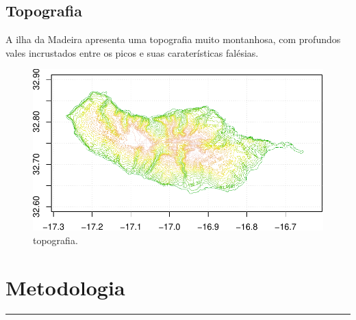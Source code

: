 \documentclass[]{article}
\begin{document}
\subsection{Topografia}\label{topografia}

A ilha da Madeira apresenta uma topografia muito montanhosa, com
profundos vales incrustados entre os picos e suas caraterísticas
falésias.

\begin{figure}

{\centering \includegraphics{static_files/figure-latex/topography-1} 

}

\caption{topografia.}\label{fig:topography}
\end{figure}

\section{Metodologia}\label{metodologia}

\begin{center}\rule{0.5\linewidth}{\linethickness}\end{center}
\end{document}
